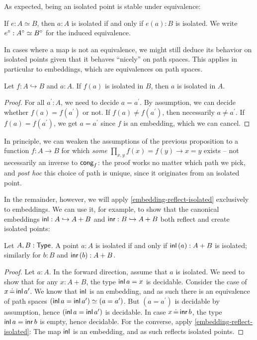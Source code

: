 As expected, being an isolated point is stable under equivalence:
\begin{lemma}\label{is-isolated-respect-equiv}
  If \( e : A \simeq B \),
  then \( a : A \) is isolated if and only if \( e(a) : B \) is isolated.
  We write \( e^{\circ} : A^{\circ} \simeq B^{\circ} \) for the induced equivalence.
\end{lemma}
In cases where a map is not an equivalence,
we might still deduce its behavior on isolated points given that it behaves \enquote{nicely} on path spaces.
This applies in particular to embeddings, which are equivalences on path spaces.
\begin{proposition}[note={Embeddings reflect isolated points}]\label{embedding-reflect-isolated}
  Let \( f : A \hookrightarrow B \) and \( a : A \).
  If \( f(a) \) is isolated in \( B \), then \( a \) is isolated in \( A \).
  \begin{proof}
    For all \( a^\prime : A \), we need to decide \( a = a^\prime \).
    By assumption, we can decide whether \( f(a) = f(a^\prime) \) or not.
    If \( f(a) \neq f(a^\prime) \), then necessarily \( a \neq a^\prime \).
    If \( f(a) = f(a^\prime) \), we get \( a = a^\prime \) since \( f \) is an embedding, which we can cancel.
  \end{proof}
\end{proposition}
In principle, we can weaken the assumptions of the previous proposition to a function \( f : A \to B \)
for which \emph{some} \( \prod_{x,y} f(x) = f(y) \to x = y \) exists -- not necessarily an inverse to \( \mathsf{cong}_f \):
the proof works no matter which path we pick,
and \emph{post hoc} this choice of path is unique, since it originates from an isolated point.

In the remainder, however, we will apply \autoref{embedding-reflect-isolated} exclusively to embeddings.
We can use it, for example, to show that the canonical embeddings \( \operatorname{\mathsf{inl}} : A \hookrightarrow A + B \) and \( \operatorname{\mathsf{inr}} : B \hookrightarrow A + B \)
both reflect and create isolated points:

\begin{proposition}\label{sum-embeddings-respect-isolated}
  Let \( A, B : \operatorname{\mathsf{Type}} \).
  A point \( a : A \) is isolated if and only if \( \operatorname{\mathsf{inl}}{(a)} : A + B \) is isolated;
  similarly for \( b : B \) and \( \operatorname{\mathsf{inr}}{(b)} : A + B \).
  \begin{proof}
    Let \( a : A \). In the forward direction, assume that \( a \) is isolated.
    We need to show that for any \( x : A + B \), the type \( \operatorname{\mathsf{inl}}{a} = x \) is decidable.
    Consider the case of \( x \operatorname{\mathrel{\doteq}} \operatorname{\mathsf{inl}}{a^{\prime}} \).
    We know that \( \operatorname{\mathsf{inl}} \) is an embedding, and as such there is an equivalence
    of path spaces \( (\operatorname{\mathsf{inl}}{a} = \operatorname{\mathsf{inl}}{a^\prime}) \simeq (a = a^\prime) \).
    But \( (a = a^\prime) \) is decidable by assumption,
    hence \( (\operatorname{\mathsf{inl}}{a} = \operatorname{\mathsf{inl}}{a^\prime}) \) is decidable.
    In case \( x \operatorname{\mathrel{\doteq}} \operatorname{\mathsf{inr}}{b} \), the type \( \operatorname{\mathsf{inl}}{a} = \operatorname{\mathsf{inr}}{b} \) is empty, hence decidable.
    For the converse, apply \autoref{embedding-reflect-isolated}:
    The map \( \operatorname{\mathsf{inl}} \) is an embedding, and as such reflects isolated points.
  \end{proof}
\end{proposition}

